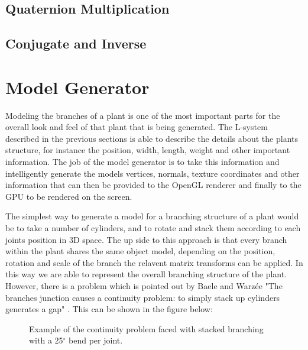 \subsection{Quaternion Multiplication}

\subsection{Conjugate and Inverse}


\section{Model Generator}

\begin{flushleft}

Modeling the branches of a plant is one of the most important parts for the overall look and feel of that plant that is being generated. The L-system described in the previous sections is able to describe the details about the plants structure, for instance the position, width, length, weight and other important information. The job of the model generator is to take this information and intelligently generate the models vertices, normals, texture coordinates and other information that can then be provided to the OpenGL renderer and finally to the GPU to be rendered on the screen. \\

\vspace{5mm}

The simplest way to generate a model for a branching structure of a plant would be to take a number of cylinders, and to rotate and stack them according to each joints position in 3D space. The up side to this approach is that every branch within the plant shares the same object model, depending on the position, rotation and scale of the branch the relavent matrix transforms can be applied. In this way we are able to represent the overall branching structure of the plant. However, there is a problem which is pointed out by Baele and Warz\'{e}e "The branches junction causes a continuity problem: to simply stack up cylinders generates a gap" \cite{baele2005real}. This can be shown in the figure below:

\FloatBarrier

\begin{figure}[htbp]
	{\centering
		\vspace{7px}
		\setlength{\fboxrule}{1pt}
		\caption{Example of the continuity problem faced with stacked branching with a 25$^{\circ}$ bend per joint.}
	}
\end{figure}


\end{flushleft}
